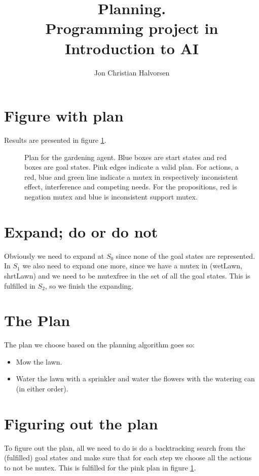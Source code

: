 \documentclass{article}
\title{Planning. \\ Programming project in Introduction to AI}
\author{Jon Christian Halvorsen }
\begin{document}
\maketitle

\section*{Figure with plan}

Results are presented in figure \ref{fig:plan}.

\begin{figure}[ht]
        \centering
        \caption{Plan for the gardening agent. Blue boxes are start states and red boxes are goal states. Pink edges indicate a valid plan. For actions, a red, blue and green line indicate a mutex in respectively inconsistent effect, interference and competing needs. For the propositions, red is negation mutex and blue is inconsistent support mutex.}
        \label{fig:plan}
\end{figure}

\section*{Expand; do or do not}
Obviously we need to expand at $S_0$ since none of the goal states are represented. In $S_1$ we also need to expand one more, since we have a mutex in (wetLawn, shrtLawn) and we need to be mutexfree in the set of all the goal states. This is fulfilled in $S_2$, so we finish the expanding.


\section*{The Plan}
The plan we choose based on the planning algorithm goes so:
\begin{itemize}
\item Mow the lawn.
\item Water the lawn with a sprinkler and water the flowers with the watering can (in either order).
\end{itemize}


\section*{Figuring out the plan}
To figure out the plan, all we need to do is do a backtracking search from the (fulfilled) goal states and make sure that for each step we choose all the actions to not be mutex. This is fulfilled for the pink plan in figure \ref{fig:plan}.
\end{document}
